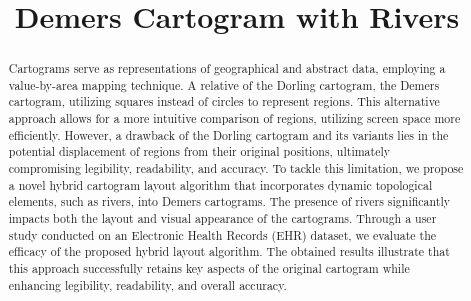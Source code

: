 \documentclass[Afour,sagev,times]{sagej}
\begin{document}
\title{Demers Cartogram with Rivers}


\begin{abstract}
    Cartograms serve as representations of geographical and abstract data, employing a value-by-area mapping technique. A relative of the Dorling cartogram, the Demers cartogram, utilizing squares instead of circles to represent regions. This alternative approach allows for a more intuitive comparison of regions, utilizing screen space more efficiently. However, a drawback of the Dorling cartogram and its variants lies in the potential displacement of regions from their original positions, ultimately compromising legibility, readability, and accuracy. To tackle this limitation, we propose a novel hybrid cartogram layout algorithm that incorporates dynamic topological elements, such as rivers, into Demers cartograms. The presence of rivers significantly impacts both the layout and visual appearance of the cartograms. Through a user study conducted on an Electronic Health Records (EHR) dataset, we evaluate the efficacy of the proposed hybrid layout algorithm. The obtained results illustrate that this approach successfully retains key aspects of the original cartogram while enhancing legibility, readability, and overall accuracy.
\end{abstract}


\maketitle
















% 




\cleardoublepage


\end{document}
